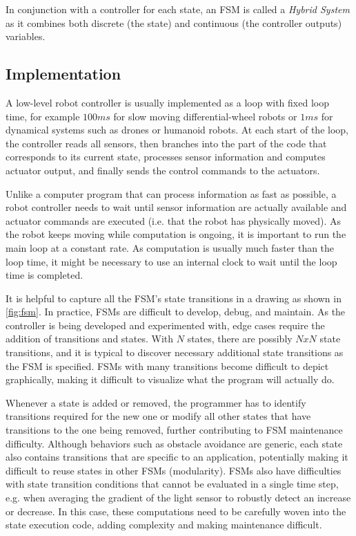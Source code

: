 In conjunction with a controller for each state, an FSM is called a \textsl{Hybrid System}\cite{van2000introduction} as it combines both discrete (the state) and continuous (the controller outputs) variables.

\subsection{Implementation}

A low-level robot controller is usually implemented as a loop with fixed loop time, for example $100ms$ for slow moving differential-wheel robots or $1ms$ for dynamical systems such as drones or humanoid robots. At each start of the loop, the controller reads all sensors, then branches into the part of the code that corresponds to its current state, processes sensor information and computes actuator output, and finally sends the control commands to the actuators.

Unlike a computer program that can process information as fast as possible, a robot controller needs to wait until sensor information are actually available and actuator commands are executed (i.e. that the robot has physically moved). As the robot keeps moving while computation is ongoing, it is important to run the main loop at a constant rate. As computation is usually much faster than the loop time, it might be necessary to use an internal clock to wait until the loop time is completed.



It is helpful to capture all the FSM's state transitions in a drawing as shown in \cref{fig:fsm}. In practice, FSMs are difficult to develop, debug, and maintain. As the controller is being developed and experimented with, edge cases require the addition of transitions and states. With $N$ states, there are possibly $NxN$ state transitions, and it is typical to discover necessary additional state transitions as the FSM is specified. FSMs with many transitions become difficult to depict graphically, making it difficult to visualize what the program will actually do.

Whenever a state is added or removed, the programmer has to identify transitions required for the new one or modify all other states that have transitions to the one being removed, further contributing to FSM maintenance difficulty. Although behaviors such as obstacle avoidance are generic, each state also contains transitions that are specific to an application, potentially making it difficult to reuse states in other FSMs (modularity). 
%
FSMs also have difficulties with state transition conditions that cannot be evaluated in a single time step, e.g. when averaging the gradient of the light sensor to robustly detect an increase or decrease. In this case, these computations need to be carefully woven into the state execution code, adding complexity and making maintenance difficult.

